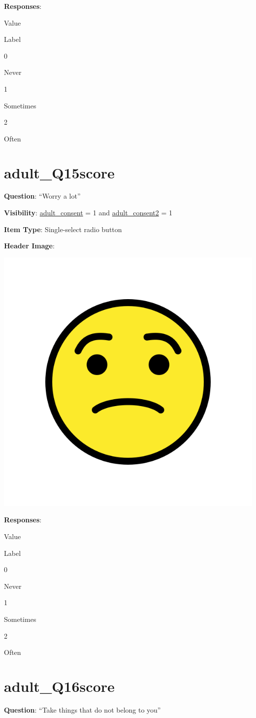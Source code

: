 \documentclass[]{book}
\begin{document}
\textbf{Responses}:

Value

Label

0

Never

1

Sometimes

2

Often

\hypertarget{adult_q15score}{%
\section{adult\_Q15score}\label{adult_q15score}}

\textbf{Question}: ``Worry a lot''

\textbf{Visibility}: \protect\hyperlink{adult_consent}{adult\_consent} = 1 and \protect\hyperlink{adult_consent2}{adult\_consent2} = 1

\textbf{Item Type}: Single-select radio button

\textbf{Header Image}:

\begin{flushleft}\includegraphics[width=0.33\linewidth]{downloadFigs4latex_HBN_PMHS_Codebook/adult_Q15score_headerImg} \end{flushleft}

\textbf{Responses}:

Value

Label

0

Never

1

Sometimes

2

Often

\hypertarget{adult_q16score}{%
\section{adult\_Q16score}\label{adult_q16score}}

\textbf{Question}: ``Take things that do not belong to you''
\end{document}
